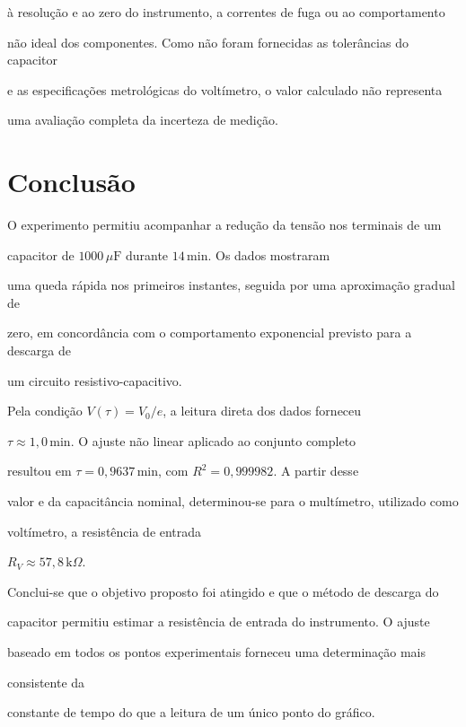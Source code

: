 \documentclass[a4paper,12pt]{article}
\begin{document}
à resolução e ao zero do instrumento, a correntes de fuga ou ao comportamento

não ideal dos componentes. Como não foram fornecidas as tolerâncias do capacitor

e as especificações metrológicas do voltímetro, o valor calculado não representa

uma avaliação completa da incerteza de medição.




\section{Conclusão}

O experimento permitiu acompanhar a redução da tensão nos terminais de um

capacitor de $1000\,\mu\mathrm{F}$ durante $14\,\mathrm{min}$. Os dados mostraram

uma queda rápida nos primeiros instantes, seguida por uma aproximação gradual de

zero, em concordância com o comportamento exponencial previsto para a descarga de

um circuito resistivo-capacitivo.

Pela condição $V(\tau)=V_0/e$, a leitura direta dos dados forneceu

$\tau\approx1{,}0\,\mathrm{min}$. O ajuste não linear aplicado ao conjunto completo

resultou em $\tau=0{,}9637\,\mathrm{min}$, com $R^2=0{,}999982$. A partir desse

valor e da capacitância nominal, determinou-se para o multímetro, utilizado como

voltímetro, a resistência de entrada

$R_V\approx57{,}8\,\mathrm{k}\Omega$.

Conclui-se que o objetivo proposto foi atingido e que o método de descarga do

capacitor permitiu estimar a resistência de entrada do instrumento. O ajuste

baseado em todos os pontos experimentais forneceu uma determinação mais

consistente da

constante de tempo do que a leitura de um único ponto do gráfico.
\end{document}
